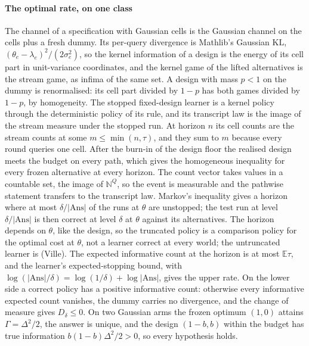 \paragraph{The optimal rate, on one class} The channel of a specification with Gaussian cells is
the Gaussian channel on the cells plus a fresh dummy. Its per-query divergence is Mathlib's
Gaussian $\mathrm{KL}$, $(\theta_e-\lambda_e)^2/(2\sigma_e^2)$, so the kernel information of a
design is the energy of its cell part in unit-variance coordinates, and the kernel game of the
lifted alternatives is the stream game, as infima of the same set. A design with mass $p<1$ on
the dummy is renormalised: its cell part divided by $1-p$ has both games divided by $1-p$, by
homogeneity. The stopped fixed-design learner is a kernel policy through the deterministic
policy of its rule, and its transcript law is the image of the stream measure under the stopped
run. At horizon $n$ its cell counts are the stream counts at some $m\le\min(n,\tau)$, and they
sum to $m$ because every round queries one cell. After the burn-in of the design floor the
realised design meets the budget on every path, which gives the homogeneous inequality for every
frozen alternative at every horizon. The count vector takes values in a countable set, the image
of $\mathbb N^{Q}$, so the event is measurable and the pathwise statement transfers to the
transcript law. Markov's inequality gives a horizon where at most $\delta/|\mathrm{Ans}|$ of the
runs at $\theta$ are unstopped; the test run at level $\delta/|\mathrm{Ans}|$ is then correct at
level $\delta$ at $\theta$ against its alternatives. The horizon depends on $\theta$, like the
design, so the truncated policy is a comparison policy for the optimal cost at $\theta$, not a
learner correct at every world; the untruncated learner is (Ville). The expected informative count at the horizon is at most $\mathbb E\tau$, and the
learner's expected-stopping bound, with $\log(|\mathrm{Ans}|/\delta)=\log(1/\delta)+\log|\mathrm{Ans}|$,
gives the upper rate. On the lower side a correct policy has a positive informative count:
otherwise every informative expected count vanishes, the dummy carries no divergence, and the
change of measure gives $D_\delta\le0$. On two Gaussian arms the frozen optimum $(1,0)$ attains
$\Gamma=\Delta^2/2$, the answer is unique, and the design $(1-b,b)$ within the budget has true
information $b(1-b)\Delta^2/2>0$, so every hypothesis holds.

